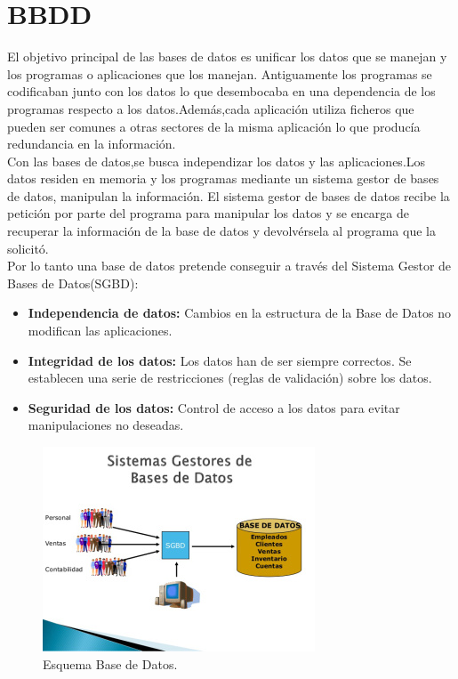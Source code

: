 \section{BBDD}
El objetivo principal de las bases de datos\cite{bbdd} es unificar los datos que se manejan y los programas o aplicaciones que los manejan. Antiguamente los programas se codificaban junto con los datos lo que desembocaba en una dependencia de los programas respecto a los datos.Además,cada aplicación utiliza ficheros que pueden ser comunes a otras sectores de la misma aplicación lo que producía redundancia en la información.
\\Con las bases de datos,se busca independizar los datos y las aplicaciones.Los datos residen en memoria y los programas mediante un sistema gestor de bases de datos, manipulan la información. El sistema gestor de bases de datos recibe la petición por parte del programa para manipular los datos y se encarga de recuperar la información de la base de datos y devolvérsela al programa que la solicitó. 
\\Por lo tanto una base de datos pretende conseguir a través del Sistema Gestor de Bases de Datos(SGBD):
\begin{itemize}
\item \textbf{Independencia de datos:} Cambios en la estructura de la Base de Datos no modifican las aplicaciones.
\item \textbf{Integridad de los datos:} Los datos han de ser siempre correctos. Se establecen una serie de restricciones (reglas de validación) sobre los datos.
\item \textbf{Seguridad de los datos:} Control de acceso a los datos para evitar manipulaciones no deseadas. 
\end{itemize}
\begin{figure}[!h]
\begin{center}
   \includegraphics[width=0.5\linewidth]{Figures/BBDD_Esquema}
	\decoRule
	\caption[Esquema Base de Datos.]{Esquema Base de Datos.}
\label{fig:BBDD_Esquema}
\end{center}
\end{figure}
